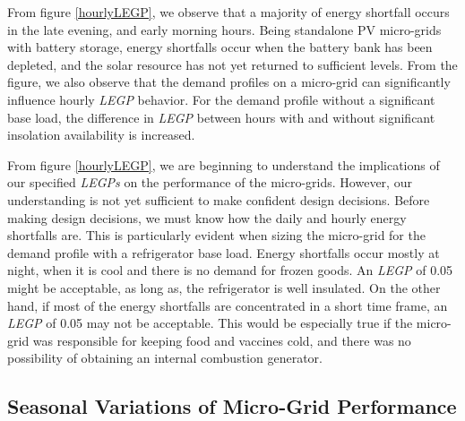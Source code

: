 \documentclass{article}
\begin{document}
From figure \ref{hourlyLEGP}, we observe that a majority of energy shortfall occurs in the late evening, and early morning hours. 
Being standalone PV micro-grids with battery storage, energy shortfalls occur when the battery bank has been depleted, and the solar resource has not yet returned to sufficient levels.
From the figure, we also observe that the demand profiles on a micro-grid can significantly influence hourly \emph{LEGP} behavior. 
For the demand profile without a significant base load, the difference in \emph{LEGP} between hours with and without significant insolation availability is increased. 

%
%

From figure \ref{hourlyLEGP}, we are beginning to understand the implications of our specified \emph{LEGPs} on the performance of the micro-grids.  
However, our understanding is not yet sufficient to make confident design decisions.
Before making design decisions, we must know how the daily and hourly energy shortfalls are. 
This is particularly evident when sizing the micro-grid for the demand profile with a refrigerator base load.  
Energy shortfalls occur mostly at night, when it is cool and there is no demand for frozen goods. 
An \emph{LEGP} of 0.05 might be acceptable, as long as, the refrigerator is well insulated. 
On the other hand, if most of the energy shortfalls are concentrated in a short time frame, an \emph{LEGP} of 0.05 may not be acceptable. 
This would be especially true if the micro-grid was responsible for keeping food and vaccines cold, and there was no possibility of obtaining an internal combustion generator. 


\subsection{Seasonal Variations of Micro-Grid Performance}
\end{document}
